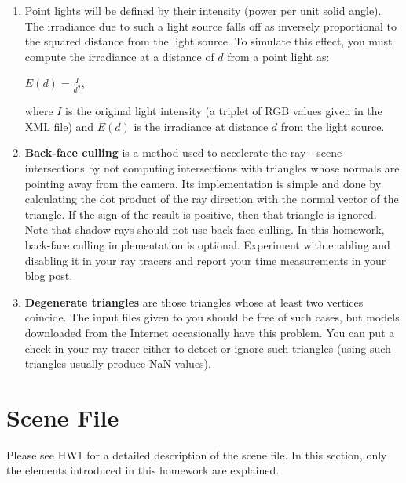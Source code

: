 \documentclass[12pt]{article}
\begin{document}
\begin{enumerate}
\item \textbf{}Point lights will be defined by their intensity (power
        per unit solid angle). The irradiance due to such a light source
falls off as inversely proportional to the squared distance from the
light source. To simulate this effect, you must compute the irradiance
at a distance of $d$ from a point light as:
%
\begin{center}
$E(d) = \frac{I}{d^2}$,
\end{center}
%
where $I$ is the original light intensity (a triplet of RGB values given
in the XML file) and $E(d)$ is the irradiance at distance $d$
from the light source.

\item \textbf{Back-face culling} is a method used to accelerate the ray
- scene intersections by not computing intersections with triangles
whose normals are pointing away from the camera. Its implementation is
simple and done by calculating the dot product of the ray direction with
the normal vector of the triangle. If the sign of the result is
positive, then that triangle is ignored. Note that shadow rays should
not use back-face culling. In this homework, back-face culling
implementation is optional. Experiment with enabling and disabling it in
your ray tracers and report your time measurements in your blog post.

\item \textbf{Degenerate triangles} are those triangles whose at least
two vertices coincide.  The input files given to you should be free of
such cases, but models downloaded from the Internet occasionally have
this problem. You can put a check in your ray tracer either to detect or
ignore such triangles (using such triangles usually produce NaN values).

\end{enumerate}

\section{Scene File}
\label{sec:sceneFile}

\noindent Please see HW1 for a detailed description of the scene file.
In this section, only the elements introduced in this homework are
explained.
\end{document}
